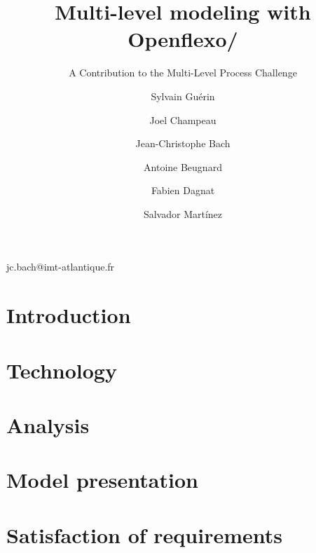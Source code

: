 \documentclass[american]{emisa}
\newcommand{\noteSM}[1]{\todo[color=red!40, author=\textbf{Salvador}, inline, caption={}]{#1}}
\newcommand{\noteJC}[1]{\todo[color=pink!40, author=\textbf{JC}, inline, caption={}]{#1}}
\newcommand{\noteSylvain}[1]{\todo[color=green!40, author=\textbf{Sylvain}, inline, caption={}]{#1}}
\newcommand{\noteAntoine}[1]{\todo[color=yellow!40, author=\textbf{Antoine}, inline, caption={}]{#1}}
\newcommand{\noteFabien}[1]{\todo[color=orange!40, author=\textbf{Fabien}, inline, caption={}]{#1}}
\newcommand{\noteJoel}[1]{\todo[color=blue!20, author=\textbf{Joel}, inline, caption={}]{#1}}
\newcommand{\mpc}{MULTI process challenge\xspace}%
\newcommand{\mlpc}{Multi-Level Process Challenge\xspace}
\begin{document}
\begin{article}{
    \title{Multi-level modeling with Openflexo/\FML}
    \subtitle{A Contribution to the \mlpc}

    \author{Sylvain Guérin}%
    \address{ENSTA Bretagne, Lab-STICC, UMR 6285, Brest, France}

    \author{Joel Champeau}
    \address[a]{}

    \author*{Jean-Christophe Bach}{jc.bach@imt-atlantique.fr}
    \address{IMT Atlantique, Lab-STICC, UMR 6285, Brest, France}

    \author{Antoine Beugnard}
    \address[b]{}

    \author{Fabien Dagnat}
    \address[b]{}

    \author{Salvador Mart\'inez}
    \address[b]{}

    \abstract{}
    
}

\section{Introduction}
\label{sec:introduction}



\section{Technology}
\label{sec:technology}


\section{Analysis}
\label{sec:analysis}


\section{Model presentation}
\label{sec:model}


\section{Satisfaction of requirements}
\label{sec:requirements}



\end{article}
\end{document}
